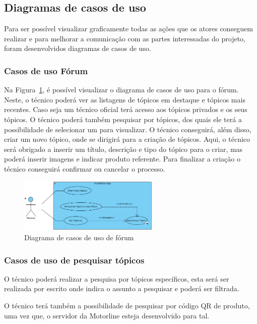 
\subsection{Diagramas de casos de uso}
Para ser possível visualizar graficamente todas as ações que os 
atores conseguem realizar e para melhorar a comunicação com as 
partes interessadas do projeto, foram desenvolvidos diagramas de 
casos de uso.

\subsubsection{Casos de uso Fórum}
Na Figura~\ref{fig:12}, é possível 
visualizar o diagrama de casos de uso para o fórum.
Neste, o técnico poderá ver as listagens de tópicos em destaque e tópicos mais recentes. Caso seja um técnico oficial terá acesso aos tópicos privados e os seus tópicos.
O técnico poderá também pesquisar por tópicos, dos quais ele terá a possibilidade de selecionar um para visualizar. 
O técnico conseguirá, além disso, criar um novo tópico, onde se dirigirá para a criação de tópicos. Aqui, o técnico será obrigado a inserir um título, descrição e tipo do tópico para o criar, 
mas poderá inserir imagens e indicar produto referente.
Para finalizar a criação o técnico conseguirá confirmar ou cancelar o processo. 

\begin{figure}[htb]
  \centering
  \includegraphics[width=0.6\textwidth]{images/diagramas/casos_de_uso/use_case_forum.png}
  \caption{Diagrama de casos de uso de fórum}
  \label{fig:12}
\end{figure}

\subsubsection{Casos de uso de pesquisar tópicos}

O técnico poderá realizar a pesquisa por tópicos específicos, 
esta será ser realizada por escrito onde indica o assunto a pesquisar e poderá ser filtrada.

O técnico terá também a possibilidade de pesquisar por código QR de produto, uma vez que, o servidor da Motorline esteja desenvolvido para tal.

